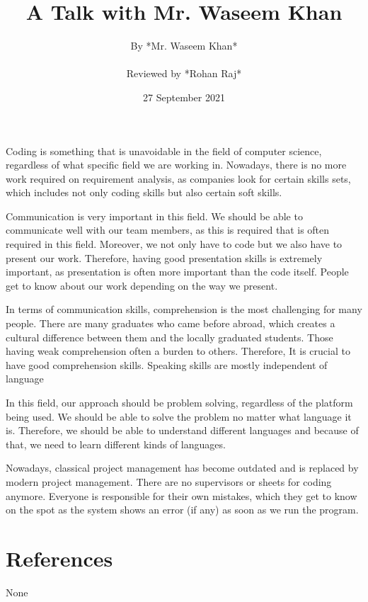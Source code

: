\documentclass{article}
\title{A Talk with Mr. Waseem Khan} %
\author{By *Mr. Waseem Khan* \\ \\ Reviewed by *Rohan Raj*} %
\date{27 September 2021} %
\begin{document}
\maketitle
Coding is something that is unavoidable in the field of computer science, regardless of what specific field we are working in. Nowadays, there is no more work required on requirement analysis, as companies look for certain skills sets, which includes not only coding skills but also certain soft skills.

\par
Communication is very important in this field. We should be able to communicate well with our team members, as this is required that is often required in this field. Moreover, we not only have to code but we also have to present our work. Therefore, having good presentation skills is extremely important, as presentation is often more important than the code itself. People get to know about our work depending on the way we present.
\par
In terms of communication skills, comprehension is the most challenging for many people. There are many graduates who came before abroad, which creates a cultural difference between them and the locally graduated students. Those having weak comprehension often a burden to others. Therefore, It is crucial to have good comprehension skills. Speaking skills are mostly independent of language
\par
In this field, our approach should be problem solving, regardless of the platform being used. We should be able to solve the problem no matter what language it is. Therefore, we should be able to understand different languages and because of that, we need to learn different kinds of languages.
\par
Nowadays, classical project management has become outdated and is replaced by modern project management. There are no supervisors or sheets for coding anymore. Everyone is responsible for their own mistakes, which they get to know on the spot as the system shows an error (if any) as soon as we run the program.

\section*{References}
None 
\end{document}
